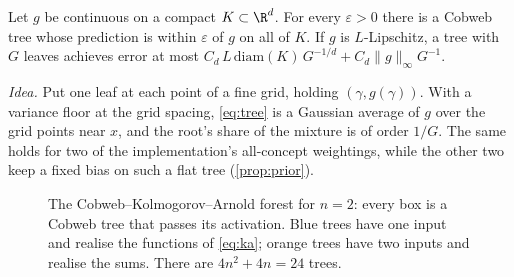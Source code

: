 \begin{theorem}\label{thm:main-single}
Let $g$ be continuous on a compact $K\subset\R^d$.  For every $\varepsilon>0$ there is a
Cobweb tree whose prediction is within $\varepsilon$ of $g$ on all of $K$.  If $g$ is
$L$-Lipschitz, a tree with $G$ leaves achieves error at most
$C_d\,L\,\mathrm{diam}(K)\,G^{-1/d}+C_d\|g\|_\infty G^{-1}$.
\end{theorem}

\emph{Idea.}  Put one leaf at each point of a fine grid, holding $(\gamma,g(\gamma))$.
With a variance floor at the grid spacing, \eqref{eq:tree} is a Gaussian average of
$g$ over the grid points near $x$, and the root's share of the mixture is of order $1/G$.
The same holds for two of the implementation's all-concept weightings, while the other
two keep a fixed bias on such a flat tree (\cref{prop:prior}).

\begin{figure}[t]
\centering
{}
\caption{The Cobweb--Kolmogorov--Arnold forest for $n=2$: every box is a Cobweb tree that
passes its activation.  Blue trees have one input and realise the functions of
\eqref{eq:ka}; orange trees have two inputs and realise the sums.  There are
$4n^2+4n=24$ trees.}
\label{fig:cka}
\end{figure}

